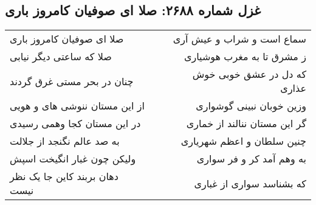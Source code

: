 \begin{center}
\section*{غزل شماره ۲۶۸۸: صلا ای صوفیان کامروز باری}
\label{sec:2688}
\begin{longtable}{l p{0.5cm} r}
صلا ای صوفیان کامروز باری
&&
سماع است و شراب و عیش آری
\\
صلا که ساعتی دیگر نیابی
&&
ز مشرق تا به مغرب هوشیاری
\\
چنان در بحر مستی غرق گردند
&&
که دل در عشق خوبی خوش عذاری
\\
از این مستان ننوشی های و هویی
&&
وزین خوبان نبینی گوشواری
\\
در این مستان کجا وهمی رسیدی
&&
گر این مستان ننالند از خماری
\\
به صد عالم نگنجد از جلالت
&&
چنین سلطان و اعظم شهریاری
\\
ولیکن چون غبار انگیخت اسپش
&&
به وهم آمد کر و فر سواری
\\
دهان بربند کاین جا یک نظر نیست
&&
که بشناسد سواری از غباری
\\
\end{longtable}
\end{center}
